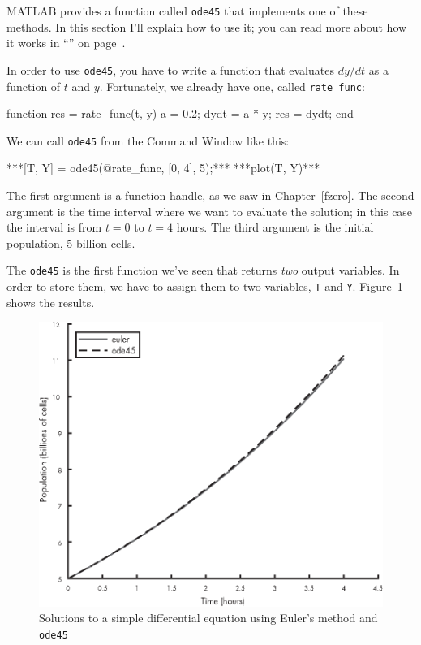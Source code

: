 
MATLAB provides a function called \lstinline{ode45} that implements one of these methods.  In this section I'll explain how to use it; you can read more about how it works in ``'' on page~\pageref{howode45}.


In order to use \lstinline{ode45}, you have to write a function that evaluates $dy/dt$ as a function of $t$ and $y$.  Fortunately, we already have one, called \lstinline{rate_func}:

\begin{code}
function res = rate_func(t, y)
   a = 0.2;
   dydt = a * y;
   res = dydt;
end
\end{code}

We can call \lstinline{ode45} from the Command Window like this:

\begin{code}
***[T, Y] = ode45(@rate_func, [0, 4], 5);***
***plot(T, Y)***
\end{code}

The first argument is a function handle, as we saw in Chapter~\ref{fzero}.  The second argument is the time interval where we want to evaluate the solution; in this case the interval is from $t=0$ to $t=4$ hours.  The third argument is the initial population, 5 billion cells.


The \lstinline{ode45} is the first function we've seen that returns \emph{two} output variables.
In order to store them, we have to assign them to two variables, \lstinline{T} and \lstinline{Y}. Figure~\ref{fig:runge} shows the results.

\begin{figure}[ht]
\includegraphics{book/images/figure09_02_new.eps}
\caption{Solutions to a simple differential equation using Euler's method and \lstinline{ode45}}
\label{fig:runge}
\end{figure}

